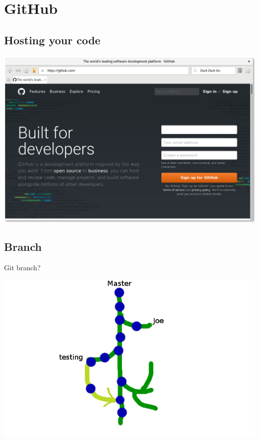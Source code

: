 \documentclass[10pt]{beamer}
\begin{document}
\section{GitHub}
\label{sec:org1175d07}
\subsection{Hosting your code}
\label{sec:org8c1590b}

\begin{center}
\includegraphics[width=.9\linewidth]{./github.png}
\end{center}

\subsection{Branch}
\label{sec:orgc9cfe9f}
\begin{frame}[label={sec:org055a17a}]{Git branch?}
\begin{center}
\includegraphics[width=.9\linewidth]{./branch.png}
\end{center}
\end{frame}
\end{document}
